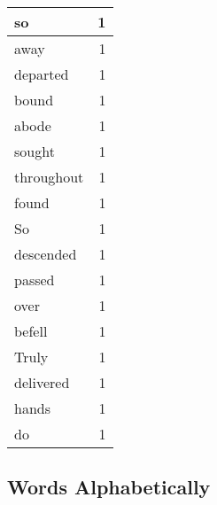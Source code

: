 \begin{center}
\begin{longtable}{l|r}
so & 1 \\ \hline
away & 1 \\ \hline
departed & 1 \\ \hline
bound & 1 \\ \hline
abode & 1 \\ \hline
sought & 1 \\ \hline
throughout & 1 \\ \hline
found & 1 \\ \hline
So & 1 \\ \hline
descended & 1 \\ \hline
passed & 1 \\ \hline
over & 1 \\ \hline
befell & 1 \\ \hline
Truly & 1 \\ \hline
delivered & 1 \\ \hline
hands & 1 \\ \hline
do & 1 \\ \hline
\end{longtable}
\end{center}



\normalsize



\subsection{Words Alphabetically}

